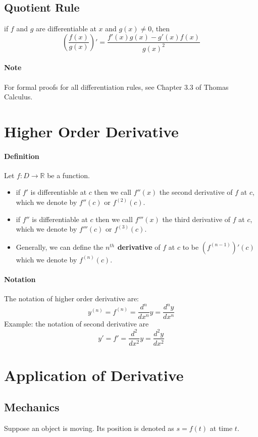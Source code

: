 \documentclass[12pt]{article}
\begin{document}
\subsection{Quotient Rule}
if $f$ and $g$ are differentiable at $x$ and $g(x) \neq 0$, then
\[
    \left(\frac{f(x)}{g(x)} \right)' = \frac{f'(x)g(x) - g'(x)f(x)}{g(x)^2} 
\]
\paragraph{Note} For formal proofs for all differentiation rules, see Chapter 3.3 of Thomas Calculus.

\section{Higher Order Derivative}
\paragraph{Definition} Let $f : D \to \mathbb{R}$ be a function.
\begin{itemize} 
    \item if $f'$ is differentiable at $c$ then we call $f''(x)$ the second derivative of $f$ at $c$, which we denote by $f''(c)$ or $f^{(2)} (c)$.
    \item if $f''$ is differentiable at $c$ then we call $f'''(x)$ the third derivative of $f$ at $c$, which we denote by $f'''(c)$ or $f^{(3)} (c)$.
    \item Generally, we can define the \textbf{$n^{th}$ derivative} of $f$ at $c$ to be $(f^{(n-1)})'(c)$ which we denote by $f^{(n)} (c)$.
\end{itemize}

\paragraph{Notation} The notation of higher order derivative are:
\[
    y^{(n)} = f^{(n)} = \frac{d^n}{dx^n} y = \frac{d^n y}{dx^n}
\]
Example: the notation of second derivative are
\[
    y' = f' = \frac{d^2}{dx^2} y = \frac{d^2 y}{dx^2}
\]

\section{Application of Derivative}
\subsection{Mechanics}
Suppose an object is moving. Its position is denoted as $s = f(t)$ at time $t$.
\end{document}
